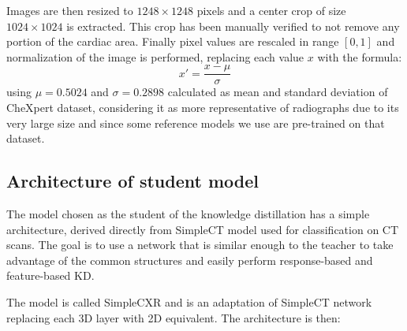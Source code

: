 Images are then resized to $1248\times1248$ pixels and a center crop of size $1024\times1024$ is extracted.
This crop has been manually verified to not remove any portion of the cardiac area.
Finally pixel values are rescaled in range $[0, 1]$ and normalization of the image is performed, replacing each value $x$ with the formula:
\begin{equation}
    x' = \frac{x - \mu}{\sigma}
    \label{eqn:normalization}
\end{equation}
using $\mu=0.5024$ and $\sigma=0.2898$ calculated as mean and standard deviation of CheXpert dataset, considering it as more representative of radiographs due to its very large size and since some reference models we use are pre-trained on that dataset.


\subsection{Architecture of student model}

The model chosen as the student of the knowledge distillation has a simple architecture, derived directly from SimpleCT model used for classification on CT scans.
The goal is to use a network that is similar enough to the teacher to take advantage of the common structures and easily perform response-based and feature-based KD.

The model is called SimpleCXR and is an adaptation of SimpleCT network replacing each 3D layer with 2D equivalent.
The architecture is then:

